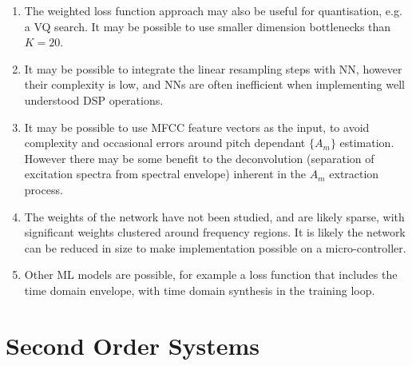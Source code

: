 \documentclass{article}
\begin{document}
\begin{enumerate}
\item The weighted loss function approach may also be useful for quantisation, e.g. a VQ search.  It may be possible to use smaller dimension bottlenecks than $K=20$.  
\item It may be possible to integrate the linear resampling steps with NN, however their complexity is low, and NNs are often inefficient when implementing well understood DSP operations.
\item It may be possible to use MFCC feature vectors as the input, to avoid complexity and occasional errors around pitch dependant $\{A_m\}$ estimation. However there may be some benefit to the deconvolution (separation of excitation spectra from spectral envelope) inherent in the ${A_m}$ extraction process.
\item The weights of the network have not been studied, and are likely sparse, with significant weights clustered around frequency regions.  It is likely the network can be reduced in size to make implementation possible on a micro-controller.
\item Other ML models are possible, for example a loss function that includes the time domain envelope, with time domain synthesis in the training loop.
\end{enumerate}

\appendix

\section{Second Order Systems}
\label{sec:second_order}
\end{document}
